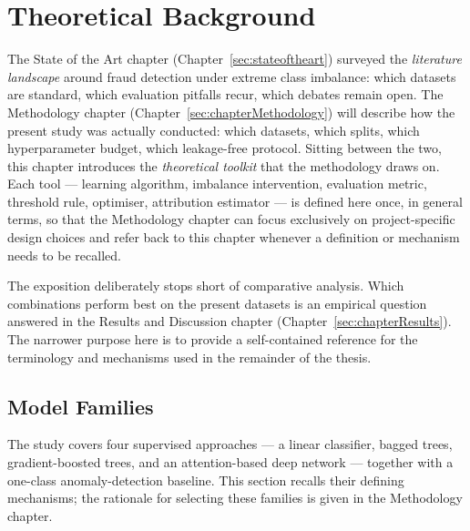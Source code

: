 \chapter{Theoretical Background}
\label{sec:chapterTheoreticalBackground}

The State of the Art chapter (Chapter~\ref{sec:stateoftheart}) surveyed the
\emph{literature landscape} around fraud detection under extreme class
imbalance: which datasets are standard, which evaluation pitfalls recur, which
debates remain open. The Methodology chapter (Chapter~\ref{sec:chapterMethodology})
will describe how the present study was actually conducted: which datasets,
which splits, which hyperparameter budget, which leakage-free protocol. Sitting
between the two, this chapter introduces the \emph{theoretical toolkit} that
the methodology draws on. Each tool --- learning algorithm, imbalance
intervention, evaluation metric, threshold rule, optimiser, attribution
estimator --- is defined here once, in general terms, so that the Methodology
chapter can focus exclusively on project-specific design choices and refer
back to this chapter whenever a definition or mechanism needs to be recalled.

The exposition deliberately stops short of comparative analysis. Which
combinations perform best on the present datasets is an empirical question
answered in the Results and Discussion chapter
(Chapter~\ref{sec:chapterResults}). The narrower purpose here is to provide a
self-contained reference for the terminology and mechanisms used in the
remainder of the thesis.

\section{Model Families}
\label{sec:tb:models}

The study covers four supervised approaches --- a linear classifier, bagged
trees, gradient-boosted trees, and an attention-based deep network --- together
with a one-class anomaly-detection baseline. This section recalls their defining
mechanisms; the rationale for selecting these families is given in the
Methodology chapter.

